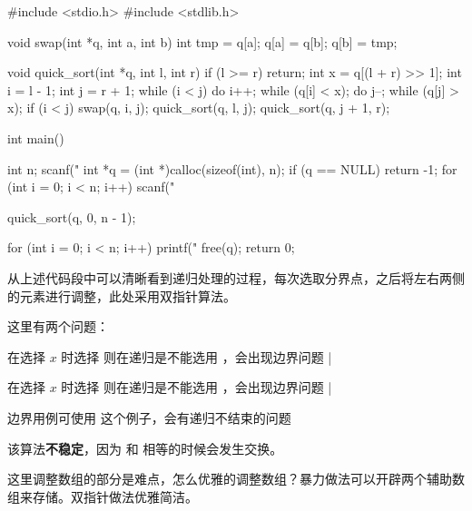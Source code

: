 \begin{mycpptwocol}
    #include <stdio.h>
    #include <stdlib.h>

    void swap(int *q, int a, int b) {
        int tmp = q[a];
        q[a] = q[b];
        q[b] = tmp;
    }

    void quick_sort(int *q, int l, int r) {
        if (l >= r) {
            return;
        }
        int x = q[(l + r) >> 1];
        int i = l - 1;
        int j = r + 1;
        while (i < j) {
            do i++; while (q[i] < x);
            do j--; while (q[j] > x);
            if (i < j) {
                swap(q, i, j);
            }
        }
        quick_sort(q, l, j);
        quick_sort(q, j + 1, r);
    }

    int main() {
        int n;
        scanf("%
        int *q = (int *)calloc(sizeof(int), n);
        if (q == NULL) {
            return -1;
        }
        for (int i = 0; i < n; i++) {
            scanf("%
        }

        quick_sort(q, 0, n - 1);

        for (int i = 0; i < n; i++) {
            printf("%
        }
        free(q);
        return 0;
    }
\end{mycpptwocol}

从上述代码段中可以清晰看到递归处理的过程，每次选取分界点，之后将左右两侧的元素进行调整，此处采用双指针算法。

\begin{keypoint}
    这里有两个问题：
    \begin{myenum}
        \item 在选择 $x$ 时选择  则在递归是不能选用 ，会出现边界问题 |  
        \item 在选择 $x$ 时选择  则在递归是不能选用 ，会出现边界问题 |  
    \end{myenum}

    边界用例可使用  这个例子，会有递归不结束的问题
\end{keypoint}

\begin{information}
    该算法\textbf{不稳定}，因为  和  相等的时候会发生交换。

    这里调整数组的部分是难点，怎么优雅的调整数组？暴力做法可以开辟两个辅助数组来存储。双指针做法优雅简洁。
\end{information}

